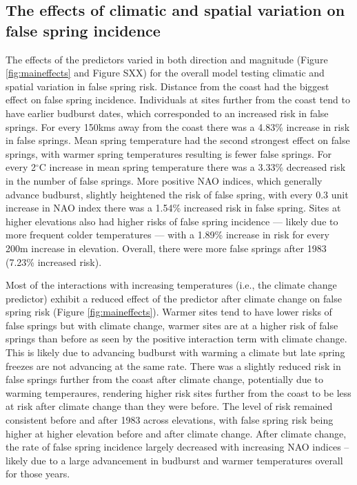 \documentclass{article}\usepackage[]{graphicx}\usepackage[]{color}
\begin{document}
\subsection*{The effects of climatic and spatial variation on false spring incidence}
The effects of the predictors varied in both direction and magnitude (Figure \ref{fig:maineffects} and Figure SXX) for the overall model testing climatic and spatial variation in false spring risk. Distance from the coast had the biggest effect on false spring incidence. Individuals at sites further from the coast tend to have earlier budburst dates, which corresponded to an increased risk in false springs. For every 150kms away from the coast there was a 4.83\% increase in risk in false springs. Mean spring temperature had the second strongest effect on false springs, with warmer spring temperatures resulting is fewer false springs. For every 2$^{\circ}$C increase in mean spring temperature there was a 3.33\% decreased risk in the number of false springs. More positive NAO indices, which generally advance budburst, slightly heightened the risk of false spring, with every 0.3 unit increase in NAO index there was a 1.54\% increased risk in false spring. Sites at higher elevations also had higher risks of false spring incidence --- likely due to more frequent colder temperatures --- with a 1.89\% increase in risk for every 200m increase in elevation. Overall, there were more false springs after 1983 (7.23\% increased risk). 

Most of the interactions with increasing temperatures (i.e., the climate change predictor) exhibit a reduced effect of the predictor after climate change on false spring risk (Figure \ref{fig:maineffects}). Warmer sites tend to have lower risks of false springs but with climate change, warmer sites are at a higher risk of false springs than before as seen by the positive interaction term with climate change. This is likely due to advancing budburst with warming a climate but late spring freezes are not advancing at the same rate. There was a slightly reduced risk in false springs further from the coast after climate change, potentially due to warming temperaures, rendering higher risk sites further from the coast to be less at risk after climate change than they were before. The level of risk remained consistent before and after 1983 across elevations, with false spring risk being higher at higher elevation before and after climate change. After climate change, the rate of false spring incidence largely decreased with increasing NAO indices -- likely due to a large advancement in budburst and warmer temperatures overall for those years. 
\end{document}
